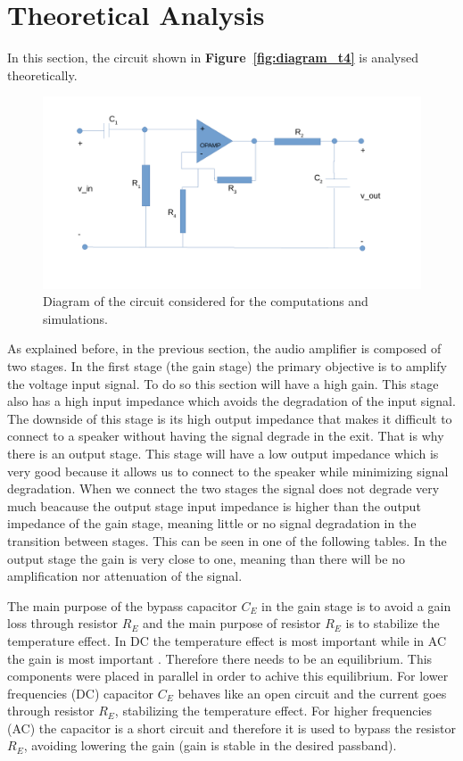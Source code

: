 \section{Theoretical Analysis}
\label{sec:analysis}

In this section, the circuit shown in \textbf{Figure~\ref{fig:diagram_t4}} is analysed
theoretically.
\begin{figure}[h] \centering
\includegraphics[width=0.95\linewidth]{diagram_t5.pdf}
\caption{Diagram of the circuit considered for the computations and simulations.}
\label{fig:diagram_t5}
\end{figure}


As explained before, in the previous section, the audio amplifier is composed of two stages. In the first stage (the gain stage) the primary objective is to amplify the voltage input signal. To do so this section will have a high gain. This stage also has a high input impedance which avoids the degradation of the input signal. The  downside of this stage is its high output impedance that makes it difficult to connect to a speaker without having the signal degrade in the exit. That is why there is an output stage. This stage will have a low output impedance which is very good because it allows us to connect to the speaker while minimizing signal degradation. When we connect the two stages the signal does not degrade very much beacause the output stage input impedance is higher than the output impedance of the gain stage, meaning little or no signal degradation in the transition between stages. This can be seen in one of the following tables. In the output stage the gain is very close to one, meaning than there will be no amplification nor attenuation of the signal.\par  

The main purpose of the bypass capacitor $C_{E}$ in the gain stage is to avoid a gain loss through resistor ${R_E}$ and the main purpose of resistor ${R_E}$ is to stabilize the temperature effect. In  DC the temperature effect is most important while in AC the gain is most important . Therefore there needs to be an equilibrium. This components were placed in parallel in order to achive this equilibrium. For lower frequencies (DC) capacitor $C_{E}$ behaves like an open circuit and the current goes through resistor ${R_E}$, stabilizing the temperature effect. For higher frequencies (AC) the capacitor is a short circuit and therefore it is used to bypass the resistor $R_{E}$, avoiding lowering the gain (gain is stable in the desired passband).\par


